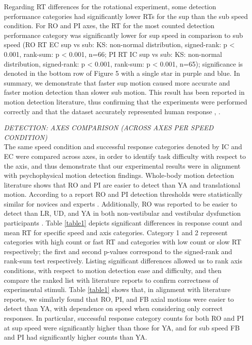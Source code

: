 \documentclass{ieeeaccess}
\begin{document}
\indent Regarding RT differences for the rotational experiment, some detection performance categories had significantly lower RTs for the sup than the sub speed condition. For RO and PI axes, the RT for the most counted detection performance category was significantly lower for sup speed in comparison to sub speed (RO RT EC sup vs sub: KS: non-normal distribution, signed-rank: p < 0.001, rank-sum: p < 0.001, n=66; PI RT IC sup vs sub: KS: non-normal distribution, signed-rank: p < 0.001, rank-sum: p < 0.001, n=65); significance is denoted in the bottom row of Figure 5 with a single star in purple and blue. In summary, we demonstrate that faster sup motion caused more accurate and faster motion detection than slower sub motion. This result has been reported in motion detection literature, thus confirming that the experiments were performed correctly and that the dataset accurately represented human response \cite{Valko_2012_Vestibular}, \cite{Hartmann_2014_Direction}.

\noindent \emph{DETECTION: AXES COMPARISON (ACROSS AXES PER SPEED CONDITION)}\\
The same speed condition and successful response categories denoted by IC and EC were compared across axes, in order to identify task difficulty with respect to the axis, and thus demonstrate that our experimental results were in alignment with psychophysical motion detection findings. Whole-body motion detection literature shows that RO and PI are easier to detect than YA and translational motion. According to a report RO and PI detection thresholds were statistically similar for novices and experts \cite{Hartmann_2014_Direction}. Additionally, RO was reported to be easier to detect than LR, UD, and YA in both non-vestibular and vestibular dysfunction participants \cite{Valko_2012_Vestibular}. Table \ref{table1} depicts significant differences in response count and mean RT for specific speed and axis categories. Category 1 and 2 represent categories with high count or fast RT and categories with low count or slow RT respectively; the first and second p-values correspond to the signed-rank and rank-sum test respectively. Listing significant differences allowed us to rank axis conditions, with respect to motion detection ease and difficulty, and then compare the ranked list with literature reports to confirm correctness of experimental stimuli. Table \ref{table1} shows that, in alignment with literature reports, we similarly found that RO, PI, and FB axial motions were easier to detect than YA, with dependence on speed when considering only correct responses. In particular, successful response category counts for both RO and PI at sup speed were significantly higher than those for YA, and for sub speed FB and PI had significantly higher counts than YA.
\end{document}
